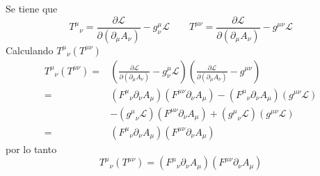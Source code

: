 \begin{itemize}
    Se tiene que 
    \begin{equation*}
      {T^\mu}_\nu =\frac{\partial \mathcal{L}}{\partial(\partial_\mu A_\nu)} - g^{\mu}_\nu \mathcal{L} \qquad
      T^{\mu\nu} =\frac{\partial \mathcal{L}}{\partial(\partial_\mu A_\nu)} - g^{\mu\nu} \mathcal{L}
    \end{equation*}
    Calculando ${T^{\mu}}_\nu(T^{\mu \nu})$
    \begin{align*}
      {T^{\mu}}_\nu(T^{\mu \nu}) =& \left(\frac{\partial \mathcal{L}}{\partial(\partial_\mu A_\nu)} - g^{\mu}_\nu \mathcal{L}\right)\left(
        \frac{\partial \mathcal{L}}{\partial(\partial_\mu A_\nu)} - g^{\mu\nu} \right)\\
        =&({F^\mu}_\nu \partial_\nu A_\mu )(F^{\mu \nu} \partial_\nu A_\mu) - ({F^\mu}_\nu \partial_\nu A_\mu )(g^{\mu \nu} \mathcal{L})
        \\ &-({g^{\mu}}_\nu\mathcal{L})(F^{\mu \nu} \partial_\nu A_\mu)  + ({g^\mu}_\nu \mathcal{L})(g^{\mu \nu}\mathcal{L}) \\
         =& ({F^\mu}_\nu \partial_\nu A_\mu )(F^{\mu \nu} \partial_\nu A_\mu) 
    \end{align*}
    por lo tanto
    \begin{equation*}
      {T^{\mu}}_\nu(T^{\mu \nu})=({F^\mu}_\nu \partial_\nu A_\mu )(F^{\mu \nu} \partial_\nu A_\mu) 
    \end{equation*}
\end{itemize}